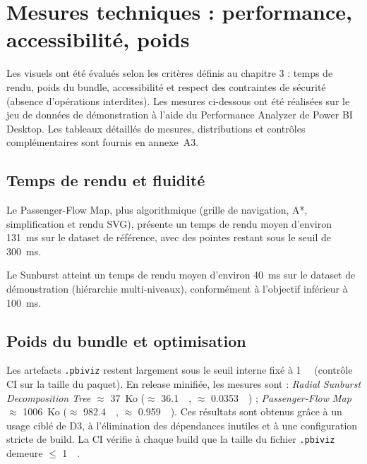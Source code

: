 \section{Mesures techniques : performance, accessibilité, poids}
\label{sec:mesures-techniques}

Les visuels ont été évalués selon les critères définis au chapitre 3 : temps de rendu, poids du bundle, accessibilité et respect des contraintes de sécurité (absence d’opérations interdites). Les mesures ci-dessous ont été réalisées sur le jeu de données de démonstration à l’aide du Performance Analyzer de Power BI Desktop. Les tableaux détaillés de mesures, distributions et contrôles complémentaires sont fournis en
annexe~A3.


\subsection{Temps de rendu et fluidité}

Le Passenger-Flow Map, plus algorithmique (grille de navigation, A*, simplification et rendu SVG), présente un temps de rendu moyen d'environ \SI{131}{\milli\second} sur le dataset de référence, avec des pointes restant sous le seuil de \SI{300}{\milli\second}. 

Le Sunburst atteint un temps de rendu moyen d’environ \SI{40}{\milli\second} sur le dataset de démonstration (hiérarchie multi-niveaux), conformément à l’objectif inférieur à \SI{100}{\milli\second}.

\subsection{Poids du bundle et optimisation}

Les artefacts \texttt{.pbiviz} restent largement sous le seuil interne fixé à \SI{1}{\mebi\byte} (contrôle CI sur la taille du paquet). En release minifiée, les mesures sont : \textit{Radial Sunburst Decomposition Tree} \(\approx\) 37~Ko (\(\approx\) \SI{36.1}{\kibi\byte}, \(\approx\) \SI{0.0353}{\mebi\byte}) ; \textit{Passenger-Flow Map} \(\approx\) 1006~Ko (\(\approx\) \SI{982.4}{\kibi\byte}, \(\approx\) \SI{0.959}{\mebi\byte}). Ces résultats sont obtenus grâce à un usage ciblé de D3, à l’élimination des dépendances inutiles et à une configuration stricte de build. La CI vérifie à chaque build que la taille du fichier \texttt{.pbiviz} demeure \(\leq\) \SI{1}{\mebi\byte}.

